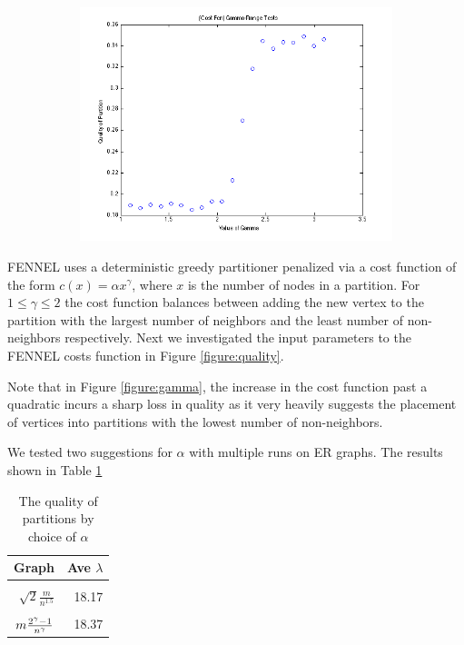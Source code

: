 \documentclass[11pt]{article}
\begin{document}
\begin{figure}[ht]
\begin{subfigure}[b]{0.5\textwidth}
\includegraphics[width=\textwidth] {figures/varied_gamma.png}
\end{subfigure}
\end{figure}
FENNEL uses a deterministic greedy partitioner penalized via a cost function of the form $c(x) = \alpha x^\gamma$, where $x$ is the number of nodes in a partition. 
For $1\le\gamma\le 2$ the cost function balances between adding the new vertex to the partition with the largest number of neighbors and the least number of non-neighbors respectively.
Next we investigated the input parameters to the FENNEL costs function in Figure \ref{figure:quality}.  

Note that in Figure \ref{figure:gamma}, the increase in the cost function past a quadratic incurs a sharp loss in quality as it very heavily suggests the placement of vertices into partitions with the lowest number of non-neighbors.

We tested two suggestions for $\alpha$ with multiple runs on ER graphs.
The results shown in Table \ref{table:qualityalpha}
\begin{table}[ht]
\centering
\caption{The quality of partitions by choice of $\alpha$}
\label{table:qualityalpha}
\begin{tabular}{r | r}\hline
Graph & Ave $\lambda$ \\ \hline &\\
$\sqrt{2}\frac{m}{n^1.5}$ & 18.17\\ &\\
$\vspace{3pt}m\frac{2^\gamma-1}{n^\gamma} $&18.37\\
\end{tabular}
\end{table}
\end{document}
